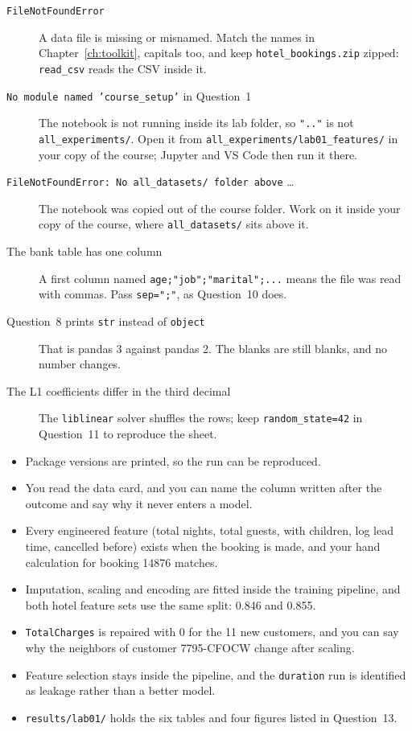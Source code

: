 \begin{troubleshoot}
\begin{description}
  \item[\texttt{FileNotFoundError}] A data file is missing or misnamed. Match the names in Chapter~\ref{ch:toolkit}, capitals too, and keep \texttt{hotel\_bookings.zip} zipped: \texttt{read\_csv} reads the CSV inside it.
  \item[\texttt{No module named 'course\_setup'} in Question~1] The notebook is not running inside its lab folder, so \texttt{".."} is not \texttt{all\_experiments/}. Open it from \texttt{all\_experiments/\allowbreak lab01\_features/} in your copy of the course; Jupyter and VS Code then run it there.
  \item[\texttt{FileNotFoundError: No all\_datasets/ folder above} \dots] The notebook was copied out of the course folder. Work on it inside your copy of the course, where \texttt{all\_datasets/} sits above it.
  \item[The bank table has one column] A first column named \texttt{age;"job";"marital";...} means the file was read with commas. Pass \texttt{sep=";"}, as Question~10 does.
  \item[Question~8 prints \texttt{str} instead of \texttt{object}] That is pandas 3 against pandas 2. The blanks are still blanks, and no number changes.
  \item[The L1 coefficients differ in the third decimal] The \texttt{liblinear} solver shuffles the rows; keep \texttt{random\_state=42} in Question~11 to reproduce the sheet.
\end{description}
\end{troubleshoot}

\begin{labchecklists}
\begin{verification}
\begin{itemize}
  \item Package versions are printed, so the run can be reproduced.
  \item You read the data card, and you can name the column written after the outcome and say why it never enters a model.
  \item Every engineered feature (total nights, total guests, with children, log lead time, cancelled before) exists when the booking is made, and your hand calculation for booking 14876 matches.
  \item Imputation, scaling and encoding are fitted inside the training pipeline, and both hotel feature sets use the same split: 0.846 and 0.855.
  \item \texttt{TotalCharges} is repaired with 0 for the 11 new customers, and you can say why the neighbors of customer 7795-CFOCW change after scaling.
  \item Feature selection stays inside the pipeline, and the \texttt{duration} run is identified as leakage rather than a better model.
  \item \texttt{results/lab01/} holds the six tables and four figures listed in Question~13.
\end{itemize}
\end{verification}
\end{labchecklists}
